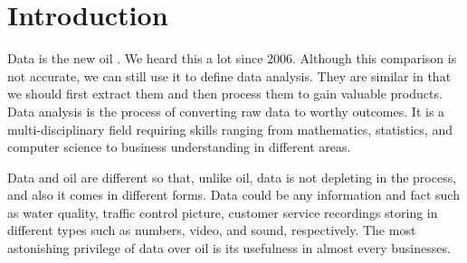 \section{Introduction}
\label{sec:intro}

Data is the new oil \cite{humby2006data}. We heard this a lot since 2006. Although this comparison is not accurate, we can still use it to define data analysis. They are similar in that we should first extract them and then process them to gain valuable products. Data analysis is the process of converting raw data to worthy outcomes.  It is a multi-disciplinary field requiring skills ranging from mathematics, statistics, and computer science to business understanding in different areas. 

Data and oil are different so that, unlike oil, data is not depleting in the process, and also it comes in different forms. Data could be any information and fact such as water quality, traffic control picture, customer service recordings storing in different types such as numbers, video, and sound, respectively.  The most astonishing privilege of data over oil is its usefulness in almost every businesses. 


















